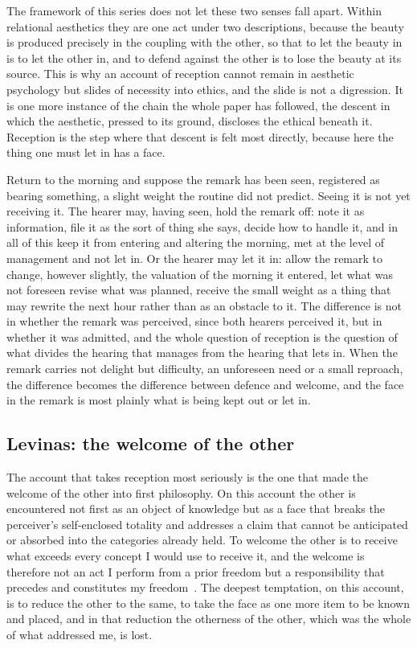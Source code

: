 The framework of this series does not let these two senses fall apart. Within relational aesthetics they are one act under two descriptions, because the beauty is produced precisely in the coupling with the other, so that to let the beauty in is to let the other in, and to defend against the other is to lose the beauty at its source. This is why an account of reception cannot remain in aesthetic psychology but slides of necessity into ethics, and the slide is not a digression. It is one more instance of the chain the whole paper has followed, the descent in which the aesthetic, pressed to its ground, discloses the ethical beneath it. Reception is the step where that descent is felt most directly, because here the thing one must let in has a face.

\begin{casebox}
Return to the morning and suppose the remark has been seen, registered as bearing something, a slight weight the routine did not predict. Seeing it is not yet receiving it. The hearer may, having seen, hold the remark off: note it as information, file it as the sort of thing she says, decide how to handle it, and in all of this keep it from entering and altering the morning, met at the level of management and not let in. Or the hearer may let it in: allow the remark to change, however slightly, the valuation of the morning it entered, let what was not foreseen revise what was planned, receive the small weight as a thing that may rewrite the next hour rather than as an obstacle to it. The difference is not in whether the remark was perceived, since both hearers perceived it, but in whether it was admitted, and the whole question of reception is the question of what divides the hearing that manages from the hearing that lets in. When the remark carries not delight but difficulty, an unforeseen need or a small reproach, the difference becomes the difference between defence and welcome, and the face in the remark is most plainly what is being kept out or let in.
\end{casebox}

\subsection{Levinas: the welcome of the other}
\label{p22:sub:reception-levinas}

The account that takes reception most seriously is the one that made the welcome of the other into first philosophy. On this account the other is encountered not first as an object of knowledge but as a face that breaks the perceiver's self-enclosed totality and addresses a claim that cannot be anticipated or absorbed into the categories already held. To welcome the other is to receive what exceeds every concept I would use to receive it, and the welcome is therefore not an act I perform from a prior freedom but a responsibility that precedes and constitutes my freedom~\parencite{levinas_totality}. The deepest temptation, on this account, is to reduce the other to the same, to take the face as one more item to be known and placed, and in that reduction the otherness of the other, which was the whole of what addressed me, is lost.

